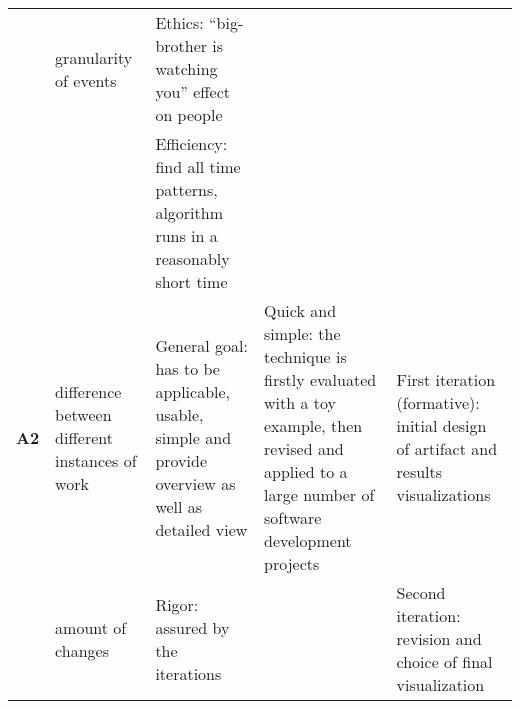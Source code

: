 \begin{longtable}[c]{@{}p{1cm}p{2.5cm}p{5cm}p{3cm}p{4cm}@{}}
                  & granularity of events                          & Ethics: “big-brother is watching you” effect on people                                                                                                                                                                                                                   &                                                                                                                                                      &                                                                                                                               \\
                  &                                                & Efficiency: find all time patterns, algorithm runs in a reasonably short time                                                                                                                                                                                            &                                                                                                                                                      &                                                                                                                               \\* \midrule
\textbf{A2}       & difference between different instances of work & General goal: has to be applicable, usable, simple and provide overview as well as detailed view                                                                                                                                                                         & Quick and simple: the technique is firstly evaluated with a toy example, then revised and applied to a large number of software development projects & First iteration (formative): initial design of artifact and results  visualizations                                           \\
                  & amount of changes                              & Rigor: assured by the iterations                                                                                                                                                                                                                                         &                                                                                                                                                      & Second iteration: revision and choice of final visualization                                                                  \\

\end{longtable}
